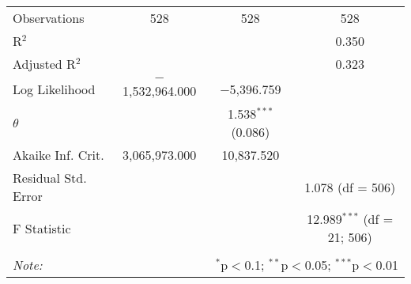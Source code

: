 \begin{table}[!htbp]
\begin{tabular}{@{\extracolsep{5pt}}lccc}
Observations & 528 & 528 & 528 \\ 
R$^{2}$ &  &  & 0.350 \\ 
Adjusted R$^{2}$ &  &  & 0.323 \\ 
Log Likelihood & $-$1,532,964.000 & $-$5,396.759 &  \\ 
$\theta$ &  & 1.538$^{***}$  (0.086) &  \\ 
Akaike Inf. Crit. & 3,065,973.000 & 10,837.520 &  \\ 
Residual Std. Error &  &  & 1.078 (df = 506) \\ 
F Statistic &  &  & 12.989$^{***}$ (df = 21; 506) \\ 
\hline 
\hline \\[-1.8ex] 
\textit{Note:}  & \multicolumn{3}{r}{$^{*}$p$<$0.1; $^{**}$p$<$0.05; $^{***}$p$<$0.01} \\ 
\end{tabular} 
\end{table} 
